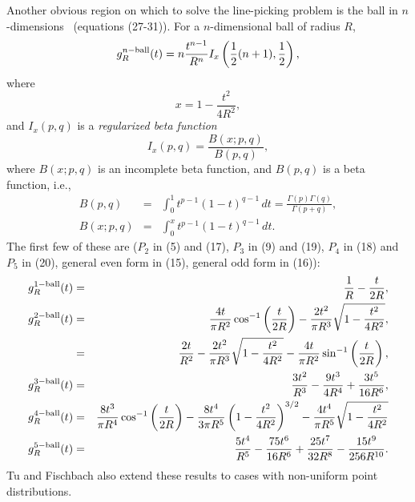Another obvious region on which to solve the line-picking problem is
the ball in $n$-dimensions~\cite{tu00:_circle_line} (equations
(27-31)). For a $n$-dimensional ball of radius $R$,
\begin{equation}
 g^{n-{\rm ball}}_R(t) = n \frac{t^{n-1}}{R^n} I_x\left( 
  \frac{1}{2} (n+1), \frac{1}{2}
                      \right),
\end{equation}
where
\begin{equation}
 x = 1 - \frac{t^2}{4 R^2}, 
\end{equation}
and $I_x(p,q)$ is a {\em regularized beta function}
\begin{equation}
   I_x(p,q) = \frac{ B(x; p,q)}{B(p,q)},
\end{equation}
where $B(x; p,q)$ is an incomplete beta function, and $B(p,q)$ is a
beta function, i.e., 
\begin{eqnarray}
  B(p,q)    & = & \int_0^1 t^{p-1} (1 - t)^{q-1} \, dt =
  \frac{\Gamma(p) \Gamma(q)}{\Gamma(p+q)}, \\
  B(x; p,q) & = & \int_0^x t^{p-1} (1 - t)^{q-1} \, dt.
\end{eqnarray}
The first few of these are \cite{tu00:_circle_line} ($P_2$ in (5) and
(17), $P_3$ in (9) and (19), $P_4$ in (18) and $P_5$ in (20), general
even form in (15), general odd form in (16)):
\begin{eqnarray}
  \label{eq:ball_line_picking}
  g^{1-{\rm ball}}_R(t) & = & \frac{1}{R} - \frac{t}{2 R}   \label{eq:line_line_picking}, \\
  g^{2-{\rm ball}}_R(t) & = & \frac{4 t}{\pi R^2} \cos^{-1} \left( \frac{t}{2R} \right)
               - \frac{2 t^2}{\pi R^3} \sqrt{1 - \frac{t^2}{4 R^2} } \label{eq:2dball_line_picking} , \\
          & = & \frac{2 t}{R^2} 
               - \frac{2 t^2}{\pi R^3} \sqrt{1 - \frac{t^2}{4 R^2} }
               - \frac{4 t}{\pi R^2} \sin^{-1} \left( \frac{t}{2R} \right) \label{eq:2dball_line_picking2} ,  \\
  g^{3-{\rm ball}}_R(t) & = & \frac{3 t^2}{R^3} - \frac{9 t^3}{4 R^4} + \frac{3 t^5}{16 R^6}   \label{eq:sphere_line_picking}  , \\
  g^{4-{\rm ball}}_R(t) & = &  \frac{8 t^3}{\pi R^4} \cos^{-1} \left( \frac{t}{2R} \right) 
              - \frac{8 t^4}{3 \pi R^5} \left( 1 - \frac{t^2}{4 R^2} \right)^{3/2}
               - \frac{4 t^4}{\pi R^5} \sqrt{1 - \frac{t^2}{4 R^2} } \\
  g^{5-{\rm ball}}_R(t) & = & \frac{5 t^4}{R^5} - \frac{75 t^6}{16 R^6} + \frac{25 t^7}{32 R^8} - \frac{15 t^9}{256 R^{10}} .
  \label{eq:ball_line_picking-end}
\end{eqnarray}
Tu and Fischbach \cite{tu00:_circle_line} also extend these results to
cases with non-uniform point distributions.
 

